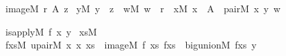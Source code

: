 \begin{isabelle}%
image{\isacharparenleft}{\kern0pt}M{\isacharcomma}{\kern0pt}\ r{\isacharcomma}{\kern0pt}\ A{\isacharcomma}{\kern0pt}\ z{\isacharparenright}{\kern0pt}\ {\isasymequiv}\isanewline
{\isasymforall}y{\isacharbrackleft}{\kern0pt}M{\isacharbrackright}{\kern0pt}{\isachardot}{\kern0pt}\ y\ {\isasymin}\ z\ {\isasymlongleftrightarrow}\ {\isacharparenleft}{\kern0pt}{\isasymexists}w{\isacharbrackleft}{\kern0pt}M{\isacharbrackright}{\kern0pt}{\isachardot}{\kern0pt}\ w\ {\isasymin}\ r\ {\isasymand}\ {\isacharparenleft}{\kern0pt}{\isasymexists}x{\isacharbrackleft}{\kern0pt}M{\isacharbrackright}{\kern0pt}{\isachardot}{\kern0pt}\ x\ {\isasymin}\ A\ {\isasymand}\ pair{\isacharparenleft}{\kern0pt}M{\isacharcomma}{\kern0pt}\ x{\isacharcomma}{\kern0pt}\ y{\isacharcomma}{\kern0pt}\ w{\isacharparenright}{\kern0pt}{\isacharparenright}{\kern0pt}{\isacharparenright}{\kern0pt}%
\end{isabelle}%
\begin{isabelle}%
is{\isacharunderscore}{\kern0pt}apply{\isacharparenleft}{\kern0pt}M{\isacharcomma}{\kern0pt}\ f{\isacharcomma}{\kern0pt}\ x{\isacharcomma}{\kern0pt}\ y{\isacharparenright}{\kern0pt}\ {\isasymequiv}\isanewline
{\isasymexists}xs{\isacharbrackleft}{\kern0pt}M{\isacharbrackright}{\kern0pt}{\isachardot}{\kern0pt}\isanewline
\isaindent{\ \ \ }{\isasymexists}fxs{\isacharbrackleft}{\kern0pt}M{\isacharbrackright}{\kern0pt}{\isachardot}{\kern0pt}\ upair{\isacharparenleft}{\kern0pt}M{\isacharcomma}{\kern0pt}\ x{\isacharcomma}{\kern0pt}\ x{\isacharcomma}{\kern0pt}\ xs{\isacharparenright}{\kern0pt}\ {\isasymand}\ image{\isacharparenleft}{\kern0pt}M{\isacharcomma}{\kern0pt}\ f{\isacharcomma}{\kern0pt}\ xs{\isacharcomma}{\kern0pt}\ fxs{\isacharparenright}{\kern0pt}\ {\isasymand}\ big{\isacharunderscore}{\kern0pt}union{\isacharparenleft}{\kern0pt}M{\isacharcomma}{\kern0pt}\ fxs{\isacharcomma}{\kern0pt}\ y{\isacharparenright}{\kern0pt}%
\end{isabelle}%
